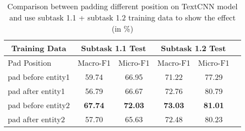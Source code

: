 \begin{table}[htbp!] %
    \begin{tabular}{lccccc}
    \toprule
        \multicolumn{1}{c}{Training Data}          & \multicolumn{2}{c}{Subtask 1.1 Test}  & \multicolumn{2}{c}{Subtask 1.2 Test} \\
    \midrule
        Pad Position                               & Macro-F1         & Micro-F1           & Macro-F1         & Micro-F1       \\
    \midrule
        pad before entity1                         & 59.74            & 66.95              & 71.22            & 77.29         \\
        pad after entity1                          & 56.79            & 66.67              & 72.76            & 80.79         \\
        pad before entity2                         & \bf67.74         & \bf72.03           & \bf73.03         & \bf81.01      \\
        pad after entity2                          & 57.70            & 65.63              & 72.48            & 80.23         \\
    \bottomrule
    \end{tabular}
\caption{Comparison between padding different position on TextCNN model and use subtask 1.1 + subtask 1.2 training data to show the effect (in \%)}
\label{tab:data_pad}
\end{table}
